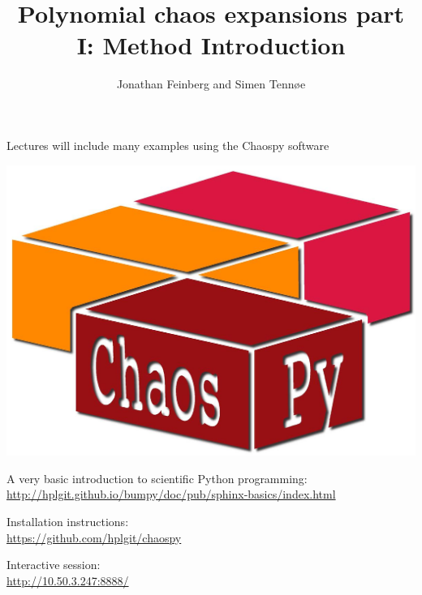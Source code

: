 \documentclass{beamer}
\title{Polynomial chaos expansions part I: Method Introduction}
\author{Jonathan Feinberg and Simen Tennøe}
\begin{document}
\begin{frame}
  \maketitle
\end{frame}

\begin{frame}[fragile]{Lectures will include many examples using the
    Chaospy software}
  \begin{center}
     \includegraphics[width=.5\textwidth]{chaospy_logo.jpg}
  \end{center}
    \begin{alert}{A very basic introduction to scientific Python programming:}
    \scriptsize
      \href{http://hplgit.github.io/bumpy/doc/pub/sphinx-basics/index.html}{http://hplgit.github.io/bumpy/doc/pub/sphinx-basics/index.html}\\
  \end{alert}
  \begin{alert}{Installation instructions:}\\
  \scriptsize
      \href{https://github.com/hplgit/chaospy}{https://github.com/hplgit/chaospy}\\
  \end{alert}
    \begin{alert}{Interactive session:}\\
  \scriptsize
\href{http://10.50.3.247:8888/}{http://10.50.3.247:8888/}

  \end{alert}
\end{frame}
\end{document}
